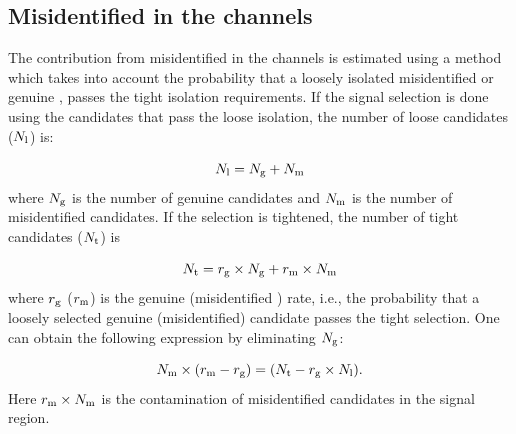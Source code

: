 \subsection{\texorpdfstring{Misidentified \Tau in the \leptonTau channels}{Misidentified tau in the lepton-tau channels}}
\label{sect:bkgFake}
The contribution from misidentified \Tau in the \leptonTau channels is estimated using a method which takes into account the probability that a loosely isolated misidentified or genuine \Tau,
passes the tight isolation requirements.
If the signal selection is done using the \Tau candidates that pass the loose isolation, 
the number of loose \Tau candidates ($N_{\rm l}$) is:

\begin{equation}
N_{\rm l} = N_{\rm g} + N_{\rm m}
\end{equation}
where $N_{\rm g}$ is the number of genuine \Tau candidates and $N_{\rm m}$ is the number of misidentified 
\Tau candidates. If the selection is tightened, the number of tight \Tau candidates ($N_{\rm t}$)  is

\begin{equation}
 N_{\rm t} = r_{\rm g}\times N_{\rm g} + r_{\rm m}\times N_{\rm m}
\end{equation} 
where $r_{\rm g}$ ($r_{\rm m}$) is the genuine (misidentified \Tau) rate, i.e., the probability that a loosely selected genuine (misidentified) \Tau candidate passes the  tight  selection. 
One can obtain the following expression by eliminating $N_{\rm g}$:

\begin{equation}
   N_{\rm m}\times (r_{\rm m}-r_{\rm g}) = (N_{\rm t} - r_{\rm g}\times N_{\rm l}).
\end{equation}
Here $r_{\rm m}\times N_{\rm m}$ is the contamination of misidentified \Tau candidates in the signal region. 

